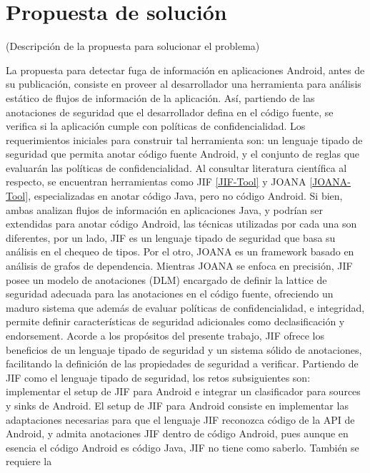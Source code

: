 \section{Propuesta de solución}
\label{sec:propuesta-sol} 
(Descripción de la propuesta para solucionar el problema)

La propuesta para detectar fuga de información en aplicaciones Android, antes de
su publicación, consiste en proveer al desarrollador una herramienta para
análisis estático de flujos de información de la aplicación. Así, partiendo de
las anotaciones de seguridad que el desarrollador defina en el código fuente, se
verifica si la aplicación cumple con políticas de confidencialidad.\newline
Los requerimientos iniciales para construir tal herramienta son: un lenguaje
tipado de seguridad que permita anotar código fuente Android, y el conjunto de
reglas que evaluarán las políticas de confidencialidad.\newline 
Al consultar literatura científica al respecto, se encuentran herramientas como
JIF \ref{JIF-Tool} y JOANA \ref{JOANA-Tool}, especializadas en anotar código
Java, pero no código Android.
Si bien, ambas analizan flujos de información en aplicaciones Java, y podrían
ser extendidas para anotar código Android, las técnicas utilizadas por cada una
son diferentes, por un lado, JIF es un lenguaje tipado de seguridad que basa su
análisis en el chequeo de tipos. Por el otro, JOANA es un framework basado en
análisis de grafos de dependencia. Mientras JOANA se enfoca en precisión, JIF
posee un modelo de anotaciones (DLM) encargado de definir la lattice de
seguridad adecuada para las anotaciones en el código fuente, ofreciendo un
maduro sistema que además de evaluar políticas de confidencialidad, e
integridad, permite definir características de seguridad adicionales como
declasificación y endorsement.
Acorde a los propósitos del presente trabajo, JIF ofrece los beneficios de un
lenguaje tipado de seguridad y un sistema  sólido  de anotaciones, facilitando
la definición de las propiedades de seguridad a verificar.\newline 
Partiendo de JIF como el lenguaje tipado de seguridad, los retos subsiguientes
son: implementar el setup de JIF para Android e integrar un clasificador
para sources y sinks de Android. 
El setup de JIF para Android consiste en implementar las adaptaciones necesarias
para que el lenguaje JIF reconozca código de la API de Android, y admita
anotaciones JIF dentro de código Android, pues aunque en esencia el código
Android es código Java, JIF no tiene como saberlo. También se requiere la
